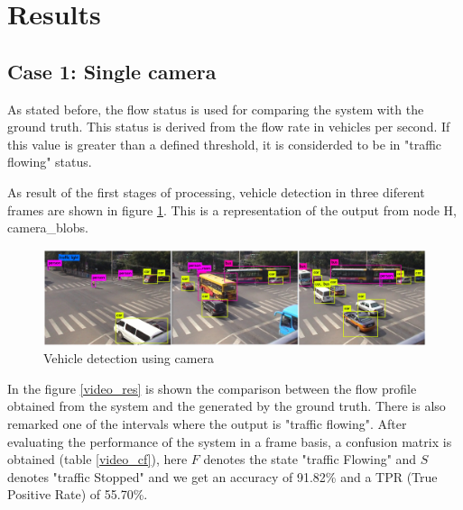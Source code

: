 %


\section{Results}

\subsection{Case 1: Single camera}

As stated before, the flow status is used for comparing the system with the ground truth. This status is derived from the flow rate in vehicles per second. If this value is greater than a defined threshold, it is considerded to be in "traffic flowing" status.

As result of the first stages of processing, vehicle detection in three diferent frames are shown in figure \ref{camera_detection}. This is a representation of the output from node H, camera\_blobs.

\begin{figure}[ht!]
\centering
\includegraphics[scale=0.11]{fig/4/camera.jpeg}
\caption{Vehicle detection using camera}
\label{camera_detection}
\end{figure}

In the figure \ref{video_res} is shown the comparison between the flow profile obtained from the system and the generated by the ground truth. There is also remarked one of the intervals where the output is "traffic flowing". After evaluating the performance of the system in a frame basis, a confusion matrix is obtained (table \ref{video_cf}), here $F$ denotes the state "traffic Flowing" and $S$ denotes "traffic Stopped" and we get an accuracy of 91.82\% and a TPR (True Positive Rate) of 55.70\%.

